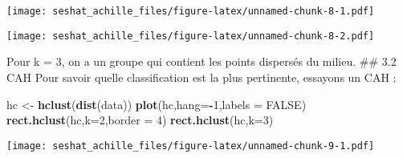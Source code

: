\documentclass[
]{article}
\newenvironment{Shaded}{\begin{snugshade}}{\end{snugshade}}
\newcommand{\DataTypeTok}[1]{\textcolor[rgb]{0.13,0.29,0.53}{#1}}
\newcommand{\DecValTok}[1]{\textcolor[rgb]{0.00,0.00,0.81}{#1}}
\newcommand{\KeywordTok}[1]{\textcolor[rgb]{0.13,0.29,0.53}{\textbf{#1}}}
\newcommand{\NormalTok}[1]{#1}
\newcommand{\OperatorTok}[1]{\textcolor[rgb]{0.81,0.36,0.00}{\textbf{#1}}}
\newcommand{\OtherTok}[1]{\textcolor[rgb]{0.56,0.35,0.01}{#1}}
\newcommand{\StringTok}[1]{\textcolor[rgb]{0.31,0.60,0.02}{#1}}
\begin{document}
\begin{Shaded}
\end{Shaded}

\texttt{[image: seshat\_achille\_files/figure-latex/unnamed-chunk-8-1.pdf]}

\begin{Shaded}
\end{Shaded}

\texttt{[image: seshat\_achille\_files/figure-latex/unnamed-chunk-8-2.pdf]}

Pour k = 3, on a un groupe qui contient les points dispersés du milieu.
\#\# 3.2 CAH Pour savoir quelle classification est la plus pertinente,
essayons un CAH :

\begin{Shaded}
\begin{Highlighting}[]
\NormalTok{hc <-}\StringTok{ }\KeywordTok{hclust}\NormalTok{(}\KeywordTok{dist}\NormalTok{(data))}
\KeywordTok{plot}\NormalTok{(hc,}\DataTypeTok{hang=}\OperatorTok{-}\DecValTok{1}\NormalTok{,}\DataTypeTok{labels =} \OtherTok{FALSE}\NormalTok{)}
\KeywordTok{rect.hclust}\NormalTok{(hc,}\DataTypeTok{k=}\DecValTok{2}\NormalTok{,}\DataTypeTok{border =} \DecValTok{4}\NormalTok{)}
\KeywordTok{rect.hclust}\NormalTok{(hc,}\DataTypeTok{k=}\DecValTok{3}\NormalTok{)}
\end{Highlighting}
\end{Shaded}

\texttt{[image: seshat\_achille\_files/figure-latex/unnamed-chunk-9-1.pdf]}
\end{document}
